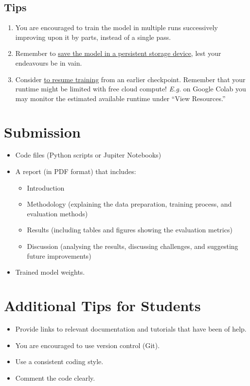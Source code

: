 \documentclass[11pt]{article}
\begin{document}
\subsection{Tips}
\label{sec:org2e63696}
\begin{enumerate}
\item You are encouraged to train the model in multiple
runs successively improving upon it by parts,
instead of a single pass.
\item Remember to \href{https://colab.research.google.com/notebooks/io.ipynb}{save the model in a persistent storage
device}, lest your endeavours be in vain.
\item Consider \href{https://docs.ultralytics.com/modes/train/\#resuming-interrupted-trainings}{to resume training} from an earlier
checkpoint.  Remember that your runtime might be
limited with free cloud compute!  \emph{E.g.} on Google
Colab you may monitor the estimated available
runtime under ``View Resources.''
\end{enumerate}
\section{Submission}
\label{sec:org5d0f536}
\begin{itemize}
\item Code files (Python scripts or Jupiter Notebooks)
\item A report (in PDF format) that includes:
\begin{itemize}
\item Introduction
\item Methodology (explaining the data preparation,
training process, and evaluation methods)
\item Results (including tables and figures showing the
evaluation metrics)
\item Discussion (analysing the results, discussing
challenges, and suggesting future improvements)
\end{itemize}
\item Trained model weights.
\end{itemize}
\section{Additional Tips for Students}
\label{sec:orgcf18b23}
\begin{itemize}
\item Provide links to relevant documentation and
tutorials that have been of help.
\item You are encouraged to use version control (Git).
\item Use a consistent coding style.
\item Comment the code clearly.
\end{itemize}
\end{document}
